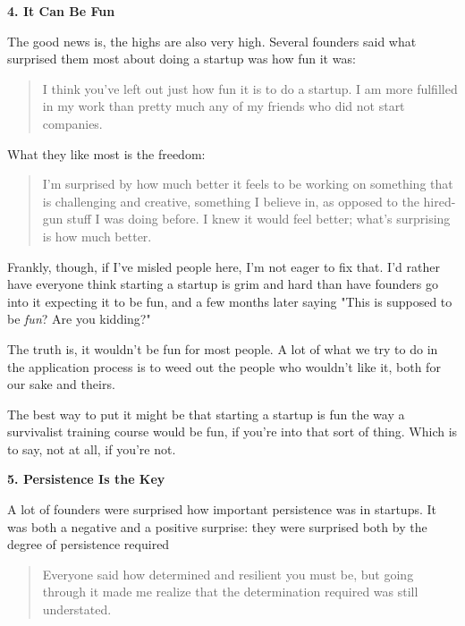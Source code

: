                   \textbf{4. It Can Be Fun}

The good news is, the highs
                  are also very high. Several founders said what surprised them
                  most about doing a startup was how fun it was:
                  \begin{quote}

                    I think you've left out just how fun it is to do a startup.
                    I am more fulfilled in my work than pretty much any of my
                    friends who did not start companies.
                  
\end{quote}

                  What they like most is the freedom:
                  \begin{quote}

                    I'm surprised by how much better it feels to be working on
                    something that is challenging and creative, something I
                    believe in, as opposed to the hired-gun stuff I was doing
                    before. I knew it would feel better; what's surprising is
                    how much better.
                  
\end{quote}

                  Frankly, though, if I've misled people here, I'm not eager to
                  fix that. I'd rather have everyone think starting a startup is
                  grim and hard than have founders go into it expecting it to be
                  fun, and a few months later saying "This is supposed to be
                  \emph{fun}? Are you kidding?"

The truth is, it
                  wouldn't be fun for most people. A lot of what we try to do in
                  the application process is to weed out the people who wouldn't
                  like it, both for our sake and theirs.

The best way
                  to put it might be that starting a startup is fun the way a
                  survivalist training course would be fun, if you're into that
                  sort of thing. Which is to say, not at all, if you're not.


                  \textbf{5. Persistence Is the Key}

A lot of founders
                  were surprised how important persistence was in startups. It
                  was both a negative and a positive surprise: they were
                  surprised both by the degree of persistence required
                  \begin{quote}

                    Everyone said how determined and resilient you must be, but
                    going through it made me realize that the determination
                    required was still understated.
                  
\end{quote}

